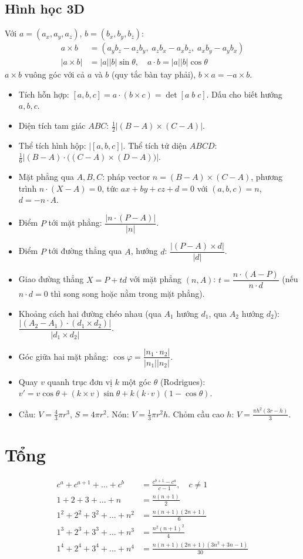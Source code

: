 \subsection{Hình học 3D}
Với $a=(a_x,a_y,a_z)$, $b=(b_x,b_y,b_z)$:
\begin{align*}
a\times b &= (a_yb_z-a_zb_y,\; a_zb_x-a_xb_z,\; a_xb_y-a_yb_x)\\
|a\times b| &= |a||b|\sin\theta, \quad a\cdot b = |a||b|\cos\theta
\end{align*}
$a\times b$ vuông góc với cả $a$ và $b$ (quy tắc bàn tay phải), $b\times a=-a\times b$.
\begin{itemize}
\item Tích hỗn hợp: $[a,b,c]=a\cdot(b\times c)=\det[a\;b\;c]$. Dấu cho biết hướng $a,b,c$.
\item Diện tích tam giác $ABC$: $\frac12|(B-A)\times(C-A)|$.
\item Thể tích hình hộp: $|[a,b,c]|$. Thể tích tứ diện $ABCD$:
      $\frac16\left|(B-A)\cdot\big((C-A)\times(D-A)\big)\right|$.
\item Mặt phẳng qua $A,B,C$: pháp vector $n=(B-A)\times(C-A)$,
      phương trình $n\cdot(X-A)=0$, tức $ax+by+cz+d=0$ với $(a,b,c)=n$, $d=-n\cdot A$.
\item Điểm $P$ tới mặt phẳng: $\dfrac{|n\cdot(P-A)|}{|n|}$.
\item Điểm $P$ tới đường thẳng qua $A$, hướng $d$: $\dfrac{|(P-A)\times d|}{|d|}$.
\item Giao đường thẳng $X=P+td$ với mặt phẳng $(n,A)$:
      $t=\dfrac{n\cdot(A-P)}{n\cdot d}$ (nếu $n\cdot d=0$ thì song song hoặc nằm trong mặt phẳng).
\item Khoảng cách hai đường chéo nhau (qua $A_1$ hướng $d_1$, qua $A_2$ hướng $d_2$):
      $\dfrac{|(A_2-A_1)\cdot(d_1\times d_2)|}{|d_1\times d_2|}$.
\item Góc giữa hai mặt phẳng: $\cos\varphi=\dfrac{|n_1\cdot n_2|}{|n_1||n_2|}$.
\item Quay $v$ quanh trục đơn vị $k$ một góc $\theta$ (Rodrigues):
      $v'=v\cos\theta+(k\times v)\sin\theta+k(k\cdot v)(1-\cos\theta)$.
\item Cầu: $V=\frac43\pi r^3$, $S=4\pi r^2$. Nón: $V=\frac13\pi r^2h$. Chỏm cầu cao $h$: $V=\frac{\pi h^2(3r-h)}{3}$.
\end{itemize}

\section{Tổng}
\begin{align*}
    c^a + c^{a+1} + \dots + c^b
    &= \frac{c^{b+1} - c^a}{c-1}, \quad c \neq 1 \\[6pt]
    1 + 2 + 3 + \dots + n
    &= \frac{n(n+1)}{2} \\
    1^2 + 2^2 + 3^2 + \dots + n^2
    &= \frac{n(n+1)(2n+1)}{6} \\
    1^3 + 2^3 + 3^3 + \dots + n^3
    &= \frac{n^2(n+1)^2}{4} \\
    1^4 + 2^4 + 3^4 + \dots + n^4
    &= \frac{n(n+1)(2n+1)(3n^2+3n-1)}{30}
\end{align*}

